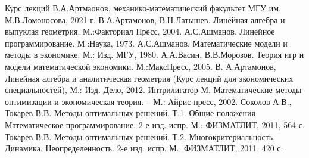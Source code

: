 \begin{thebibliography}{}
		Курс лекций В.А.Артмаонов, механико-математический факультет МГУ им. М.В.Ломоносова, 2021 г.
		В.А.Артамонов, В.Н.Латышев. Линейная алгебра и выпуклая геометрия. М.:Факториал Пресс, 2004.
		А.С.Ашманов. Линейное программирование. М.:Наука, 1973.
		А.С.Ашманов. Математические модели и методы в экономике. М.: Изд. МГУ, 1980.
		А.А.Васин, В.В.Морозов. Теория игр и модели математической экономики. М.:МаксПресс, 2005.
		В. А.Артамонов, Линейная алгебра и аналитическая геометрия (Курс лекций для экономических специальностей), М.: Изд. Дело, 2012.
		Интрилигатор М. Математические методы оптимизации и экономическая теория. – М.: Айрис-пресс, 2002.
		Соколов А.В., Токарев В.В. Методы оптимальных решений. Т.1. Общие положения Математическое программирование. 2-е изд. испр. М.: ФИЗМАТЛИТ, 2011, 564 с.
		Токарев В.В. Методы оптимальных решений. Т.2. Многокритериальность, Динамика. Неопределенность. 2-е изд. испр. М.: ФИЗМАТЛИТ, 2011, 420 с.
\end{thebibliography}

